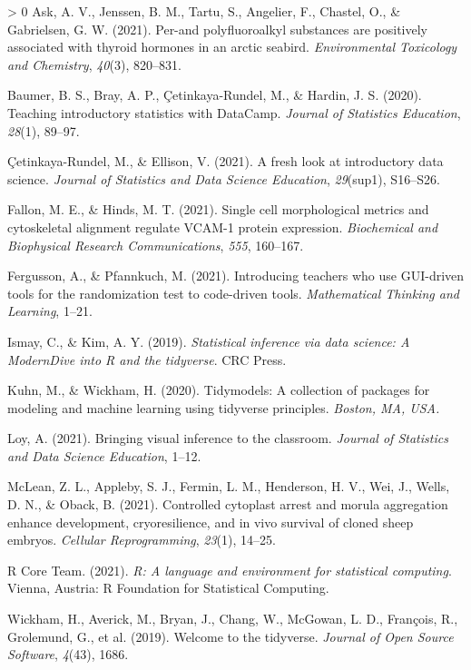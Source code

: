 \documentclass[10pt,a4paper,onecolumn]{article}
\newlength{\cslhangindent}
\newenvironment{CSLReferences}[3] %
 {%
  \setlength{\parindent}{0pt}
  \ifodd #1 \everypar{\setlength{\hangindent}{\cslhangindent}}\ignorespaces\fi
  \ifnum #2 > 0
  \setlength{\parskip}{#2\baselineskip}
  \fi
 }%
 {}
\begin{document}
\hypertarget{refs}{}
\begin{CSLReferences}{1}{0}
\leavevmode\hypertarget{ref-ask2021per}{}%
Ask, A. V., Jenssen, B. M., Tartu, S., Angelier, F., Chastel, O., \&
Gabrielsen, G. W. (2021). Per-and polyfluoroalkyl substances are
positively associated with thyroid hormones in an arctic seabird.
\emph{Environmental Toxicology and Chemistry}, \emph{40}(3), 820--831.

\leavevmode\hypertarget{ref-baumer2020teaching}{}%
Baumer, B. S., Bray, A. P., Çetinkaya-Rundel, M., \& Hardin, J. S.
(2020). Teaching introductory statistics with DataCamp. \emph{Journal of
Statistics Education}, \emph{28}(1), 89--97.

\leavevmode\hypertarget{ref-cetinkaya2021fresh}{}%
Çetinkaya-Rundel, M., \& Ellison, V. (2021). A fresh look at
introductory data science. \emph{Journal of Statistics and Data Science
Education}, \emph{29}(sup1), S16--S26.

\leavevmode\hypertarget{ref-fallon2021single}{}%
Fallon, M. E., \& Hinds, M. T. (2021). Single cell morphological metrics
and cytoskeletal alignment regulate VCAM-1 protein expression.
\emph{Biochemical and Biophysical Research Communications}, \emph{555},
160--167.

\leavevmode\hypertarget{ref-fergusson2021introducing}{}%
Fergusson, A., \& Pfannkuch, M. (2021). Introducing teachers who use
GUI-driven tools for the randomization test to code-driven tools.
\emph{Mathematical Thinking and Learning}, 1--21.

\leavevmode\hypertarget{ref-ismay2019statistical}{}%
Ismay, C., \& Kim, A. Y. (2019). \emph{Statistical inference via data
science: A ModernDive into {R} and the tidyverse}. CRC Press.

\leavevmode\hypertarget{ref-kuhn2020tidymodels}{}%
Kuhn, M., \& Wickham, H. (2020). Tidymodels: A collection of packages
for modeling and machine learning using tidyverse principles.
\emph{Boston, MA, USA.}

\leavevmode\hypertarget{ref-loy2021bringing}{}%
Loy, A. (2021). Bringing visual inference to the classroom.
\emph{Journal of Statistics and Data Science Education}, 1--12.

\leavevmode\hypertarget{ref-mclean2021controlled}{}%
McLean, Z. L., Appleby, S. J., Fermin, L. M., Henderson, H. V., Wei, J.,
Wells, D. N., \& Oback, B. (2021). Controlled cytoplast arrest and
morula aggregation enhance development, cryoresilience, and in vivo
survival of cloned sheep embryos. \emph{Cellular Reprogramming},
\emph{23}(1), 14--25.

\leavevmode\hypertarget{ref-CRAN}{}%
R Core Team. (2021). \emph{R: A language and environment for statistical
computing}. Vienna, Austria: R Foundation for Statistical Computing.

\leavevmode\hypertarget{ref-wickham2019welcome}{}%
Wickham, H., Averick, M., Bryan, J., Chang, W., McGowan, L. D.,
François, R., Grolemund, G., et al. (2019). Welcome to the tidyverse.
\emph{Journal of Open Source Software}, \emph{4}(43), 1686.

\end{CSLReferences}
\end{document}
